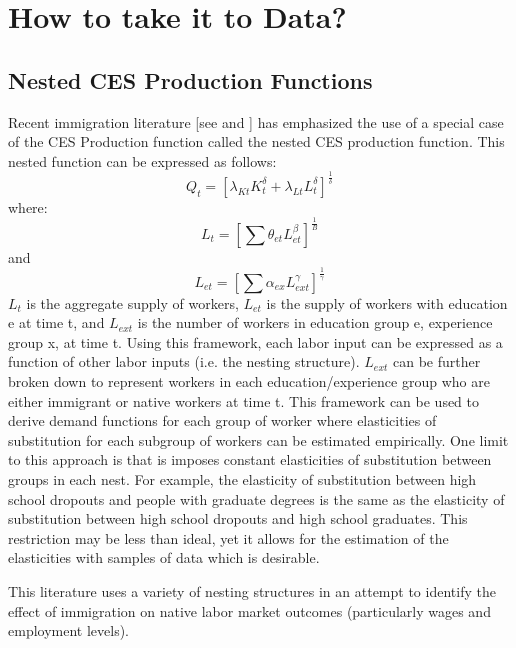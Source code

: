 \section{How to take it to Data?}
\subsection{Nested CES Production Functions}
Recent immigration literature [see \cite{Borjas2014} and \cite{LewisPeri2015}] has emphasized the use of a special case of the CES Production function called the nested CES production function.  This nested function can be expressed as follows:
\begin{equation}
Q_t = [\lambda_{Kt} K_t^\delta + \lambda_{Lt}L_t^\delta]^\frac{1}{\delta}
\end{equation}
where:
\begin{equation}
L_t = [\sum \theta_{et} L_{et}^\beta]^\frac{1}{B}
\end{equation}
and
\begin{equation}
L_{et} = [\sum \alpha_{ex} L_{ext}^\gamma]^\frac{1}{\gamma}
\end{equation}
$L_t$ is the aggregate supply of workers, $L_{et}$ is the supply of workers with education e at time t, and $L_{ext} $ is the number of workers in education group e, experience group x, at time t.  Using this framework, each labor input can be expressed as a function of other labor inputs (i.e. the nesting structure). $L_{ext}$ can be further broken down to represent workers in each education/experience group who are either immigrant or native workers at time t.  This framework can be used to derive demand functions for each group of worker where elasticities of substitution for each subgroup of workers can be estimated empirically. One limit to this approach is that is imposes constant elasticities of substitution between groups in each nest.  For example, the elasticity of substitution between high school dropouts and people with graduate degrees is the same as the elasticity of substitution between high school dropouts and high school graduates.  This restriction may be less than ideal, yet it allows for the estimation of the elasticities with samples of data which is desirable.\par
This literature uses a variety of nesting structures in an attempt to identify the effect of immigration on native labor market outcomes (particularly wages and employment levels).

